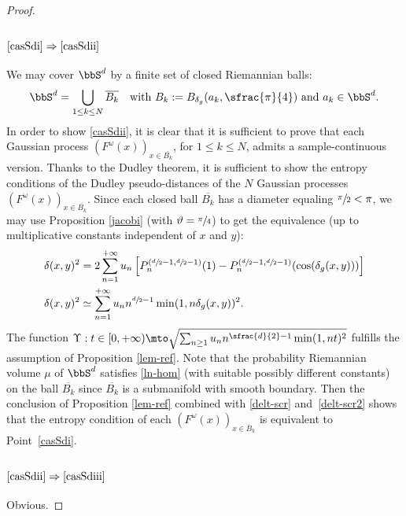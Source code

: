 \begin{proof}
\subsubsection*{$\eqref{casSdi}\Rightarrow\eqref{casSdii}$}
We may cover $\bbS^d$ by a finite set of closed Riemannian balls:
\begin{equation*}
\bbS^d= \bigcup_{1\leq k\leq N} \overline{B_k} \quad \text{with $B_k:=B_{\delta_g}
(a_k,\sfrac{\pi}{4})$ and $a_k\in \bbS^d$.}
\end{equation*}
In order to show \eqref{casSdii}, it is clear that it is sufficient to prove that each Gaussian process $(F^{\omega}(x))_{x\in \overline{B_k}}$, for $1\leq k\leq N$, admits a sample-continuous version.
Thanks to the Dudley theorem, it is sufficient to show the entropy conditions of the Dudley pseudo-distances of the $N$ Gaussian processes $(F^{\omega}(x))_{x\in \overline{B_k}}$.
Since each closed ball $\overline{B_k}$ has a diameter equaling $\sfrac{\pi}{2}<\pi$,
we may use Proposition \ref{jacobi} (with $\vartheta=\sfrac{\pi}{4}$) to get the equivalence (up to multiplicative constants independent of $x$ and $y$):
\begin{align}\notag
\delta(x,y)^2 &=2 \sum_{n=1}^{+\infty} u_n
\left[
P_n^{(\sfrac{d}{2}-1,\sfrac{d}{2}-1)}(1)
-P_n^{(\sfrac{d}{2}-1,\sfrac{d}{2}-1)}(\cos(\delta_g(x,y)))
\right]\\
\delta(x,y)^2 & \simeq \sum_{n=1}^{+\infty} u_n n^{\sfrac{d}{2}-1} \min(1,n \delta_g(x,y))^2.\label{delt-scr2}
\end{align}
The function $\Upsilon:t\in [0,+\infty)\mto \sqrt{\sum_{n\geq 1} u_n n^{\sfrac{d}{2}-1}\min(1,n t)^2}$ fulfills the assumption of Proposition \ref{lem-ref}. Note that the probability Riemannian volume $\mu$ of $\bbS^d$ satisfies \eqref{ln-hom} (with suitable possibly different constants) on the ball $\overline{B_k}$ since $\overline{B_k}$ is a submanifold with smooth boundary. Then the conclusion of Proposition \ref{lem-ref} combined with \eqref{delt-scr} and~\eqref{delt-scr2} shows that the entropy condition of each $(F^\omega(x))_{x\in \overline{B}_k}$ is equivalent to Point~\eqref{casSdi}.

\subsubsection*{$\eqref{casSdii}\Rightarrow\eqref{casSdiii}$}
Obvious.


\end{proof}
